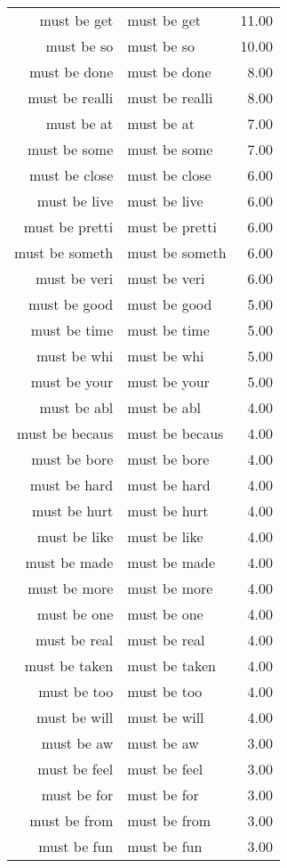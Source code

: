 \begin{table}[ht]
\begin{tabular}{rlr}
  must be get & must be get & 11.00 \\ 
  must be so & must be so & 10.00 \\ 
  must be done & must be done & 8.00 \\ 
  must be realli & must be realli & 8.00 \\ 
  must be at & must be at & 7.00 \\ 
  must be some & must be some & 7.00 \\ 
  must be close & must be close & 6.00 \\ 
  must be live & must be live & 6.00 \\ 
  must be pretti & must be pretti & 6.00 \\ 
  must be someth & must be someth & 6.00 \\ 
  must be veri & must be veri & 6.00 \\ 
  must be good & must be good & 5.00 \\ 
  must be time & must be time & 5.00 \\ 
  must be whi & must be whi & 5.00 \\ 
  must be your & must be your & 5.00 \\ 
  must be abl & must be abl & 4.00 \\ 
  must be becaus & must be becaus & 4.00 \\ 
  must be bore & must be bore & 4.00 \\ 
  must be hard & must be hard & 4.00 \\ 
  must be hurt & must be hurt & 4.00 \\ 
  must be like & must be like & 4.00 \\ 
  must be made & must be made & 4.00 \\ 
  must be more & must be more & 4.00 \\ 
  must be one & must be one & 4.00 \\ 
  must be real & must be real & 4.00 \\ 
  must be taken & must be taken & 4.00 \\ 
  must be too & must be too & 4.00 \\ 
  must be will & must be will & 4.00 \\ 
  must be aw & must be aw & 3.00 \\ 
  must be feel & must be feel & 3.00 \\ 
  must be for & must be for & 3.00 \\ 
  must be from & must be from & 3.00 \\ 
  must be fun & must be fun & 3.00 \\ 

\end{tabular}
\end{table}
